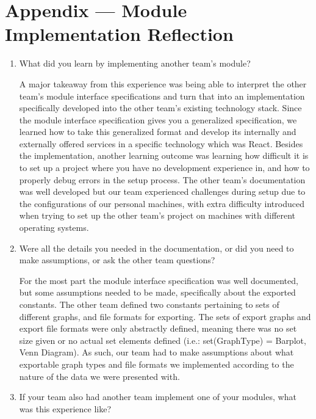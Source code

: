\documentclass[12pt, titlepage]{article}
\begin{document}
\begin{enumerate}
\end{enumerate}

\section*{Appendix --- Module Implementation Reflection}

\begin{enumerate}
  \item What did you learn by implementing another team’s module?
  
  A major takeaway from this experience was being able to interpret the other team’s module interface specifications 
  and turn that into an implementation specifically developed into the other team’s existing technology stack. 
  Since the module interface specification gives you a generalized specification, we learned how to take this 
  generalized format and develop its internally and externally offered services in a specific technology which was React. 
  Besides the implementation, another learning outcome was learning how difficult it is to set up a project 
  where you have no development experience in, and how to properly debug errors in the setup process. 
  The other team’s documentation was well developed but our team experienced challenges during setup due to 
  the configurations of our personal machines, with extra difficulty introduced when trying to set up 
  the other team’s project on machines with different operating systems.

  \item Were all the details you needed in the documentation, or did you need to make assumptions, or ask the other team questions?
  
  For the most part the module interface specification was well documented, but some assumptions needed to be made, 
  specifically about the exported constants. The other team defined two constants pertaining to sets of different graphs, 
  and file formats for exporting. The sets of export graphs and export file formats were only abstractly defined, 
  meaning there was no set size given or no actual set elements defined (i.e.: set(GraphType) = {Barplot, Venn Diagram}). 
  As such, our team had to make assumptions about what exportable graph types and file formats we implemented 
  according to the nature of the data we were presented with.

  \item If your team also had another team implement one of your modules, what was this experience like?
  

\end{enumerate}
\end{document}
